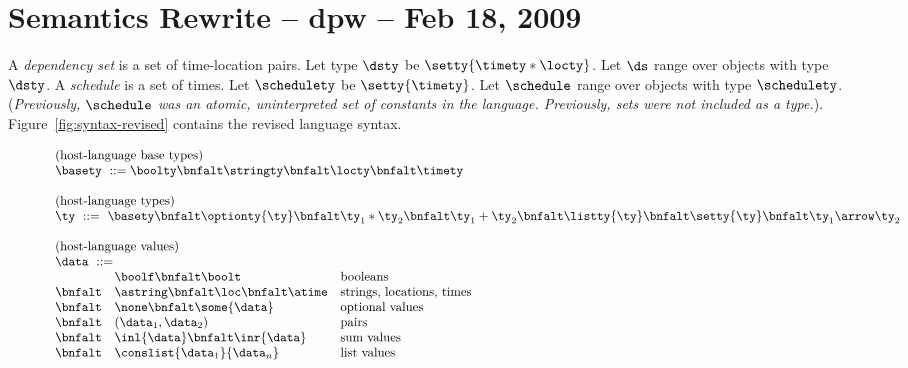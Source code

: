 \section{Semantics Rewrite -- dpw -- Feb 18, 2009}

A {\em dependency set} is a set of time-location pairs.
Let type $\dsty$ be $\setty{\timety * \locty}$. 
Let $\ds$ range over objects with type $\dsty$.
A {\em schedule} is a set of times.  Let
$\schedulety$ be $\setty{\timety}$.  Let
$\schedule$ range over objects with type $\schedulety$.
({\em Previously, $\schedule$ was an atomic, uninterpreted set of constants in the language.
Previously, sets were not included as a type.}).
Figure~\ref{fig:syntax-revised} contains the revised language 
syntax.

\begin{figure}[t]
\[
\begin{array}{lll}
\multicolumn{3}{l}{\mbox{(host-language base types)}}\\ 
\multicolumn{3}{l}{\basety \ ::= \boolty \bnfalt \stringty \bnfalt \locty \bnfalt \timety} \\
\\
\multicolumn{3}{l}{\mbox{(host-language types)}}\\ 
\multicolumn{3}{l}{\ty \ ::=\ \basety
\bnfalt \optionty{\ty}
\bnfalt \ty_1 * \ty_2
\bnfalt \ty_1 + \ty_2
\bnfalt \listty{\ty}
\bnfalt \setty{\ty}
\bnfalt \ty_1 \arrow \ty_2
} \\
\\
\multicolumn{3}{l}{\mbox{(host-language values)}}\\ 
\multicolumn{3}{l}{\data \ ::=} \\
& \boolf \bnfalt \boolt & \mbox{booleans} \\
\bnfalt & \astring \bnfalt \loc \bnfalt \atime &
 \mbox{strings, locations, times} \\
\bnfalt & \none \bnfalt 
                           \some{\data} & \mbox{optional values}\\
\bnfalt & (\data_1,\data_2) & \mbox{pairs} \\
\bnfalt & \inl{\data} \bnfalt 
                           \inr{\data} & \mbox{sum values} \\
\bnfalt & 
                           \conslist{\data_1}{\data_n} & \mbox{list values} \\


\end{array}\]
\end{figure}
